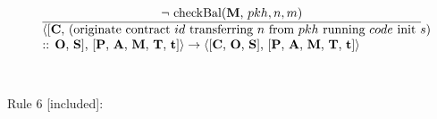 \documentclass[a4paper]{llncs}
\begin{document}
\begin{equation}{}
\frac{\text{$\neg$ checkBal(\MANAGERS, $pkh, n, m$)}}{\parbox{4.2in}{\text{$\langle$[\ACCOUNTS, (originate contract ${id}$ transferring  ${n}$ from ${pkh}$ running ${code}$ init ${s}$)} \text{:: \OPERATIONS, \CONTRACTS], [\PENDING, \ACCEPTED, \MANAGERS, \CONTRACTORS, \TIME]$\rangle \rightarrow \langle$[\ACCOUNTS, \OPERATIONS, \CONTRACTS],} \text{[\PENDING, \ACCEPTED, \MANAGERS, \CONTRACTORS, \TIME]$\rangle$}}} 
\end{equation}
~\\
~\\
Rule 6 [included]:
\begin{mathpar}
\end{mathpar}
\end{document}
